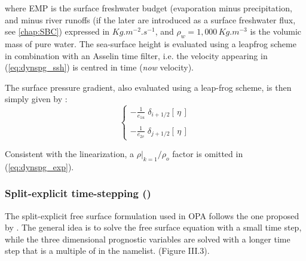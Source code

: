 \documentclass[../tex_main/NEMO_manual]{subfiles}
\begin{document}
where EMP is the surface freshwater budget (evaporation minus precipitation, and minus river runoffs (if the later are introduced as a surface freshwater flux, see \autoref{chap:SBC}) expressed in $Kg.m^{-2}.s^{-1}$, and $\rho _w =1,000\,Kg.m^{-3}$ is the volumic mass of pure water. The sea-surface height is evaluated using a leapfrog scheme in combination with an Asselin time filter, i.e. the velocity appearing in (\autoref{eq:dynspg_ssh}) is centred in time (\textit{now} velocity). 

The surface pressure gradient, also evaluated using a leap-frog scheme, is then simply given by :
\begin{equation} \label{eq:dynspg_exp}
\left\{ \begin{aligned}
 - \frac{1}    						{e_{1u}} \;	\delta _{i+1/2} \left[  \,\eta\,  \right] 	\\
 \\
 - \frac{1}    						{e_{2v}} \;	\delta _{j+1/2} \left[  \,\eta\,  \right]  
\end{aligned} \right.
\end{equation} 

Consistent with the linearization, a $\left. \rho \right|_{k=1} / \rho _o$ factor is omitted in (\autoref{eq:dynspg_exp}). 

\subsubsection{Split-explicit time-stepping (\protect{})}
\label{subsec:DYN_spg_ts}

The split-explicit free surface formulation used in OPA follows the one proposed by \citet{Griffies2004}. The general idea is to solve the free surface equation with a small time step, while the three dimensional prognostic variables are solved with a longer time step that is a multiple of 
in the   namelist. 
(Figure III.3). 
\end{document}
